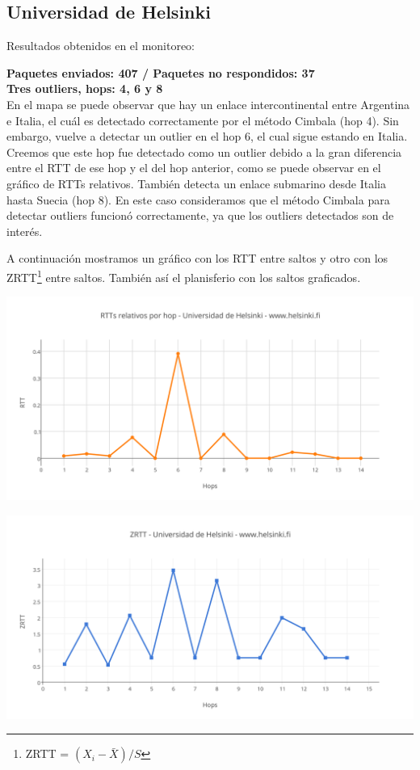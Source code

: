 \subsection{Universidad de Helsinki}

Resultados obtenidos en el monitoreo:\\

\smallskip

\bigskip

\textbf{Paquetes enviados: 407 / Paquetes no respondidos: 37}\\

\textbf{Tres outliers, hops: 4, 6 y 8}\\

En el mapa se puede observar que hay un enlace intercontinental entre Argentina e Italia, el cuál es detectado correctamente por el método Cimbala (hop 4). Sin embargo, vuelve a detectar un outlier en el hop 6, el cual sigue estando en Italia. Creemos que este hop fue detectado como un outlier debido a la gran diferencia entre el RTT de ese hop y el del hop anterior, como se puede observar en el gráfico de RTTs relativos. También detecta un enlace submarino desde Italia hasta Suecia (hop 8).
En este caso consideramos que el método Cimbala para detectar outliers funcionó correctamente, ya que los outliers detectados son de interés.


A continuación mostramos un gráfico con los RTT entre saltos y otro con los ZRTT\footnote{ZRTT = $(X_i - \bar{X}) / S$}  entre saltos. También así el planisferio con los saltos graficados.

\includegraphics[scale=0.65]{imagenes/helsinki/RTTs.png} 

\includegraphics[scale=0.65]{imagenes/helsinki/ZRTTs.png} 

